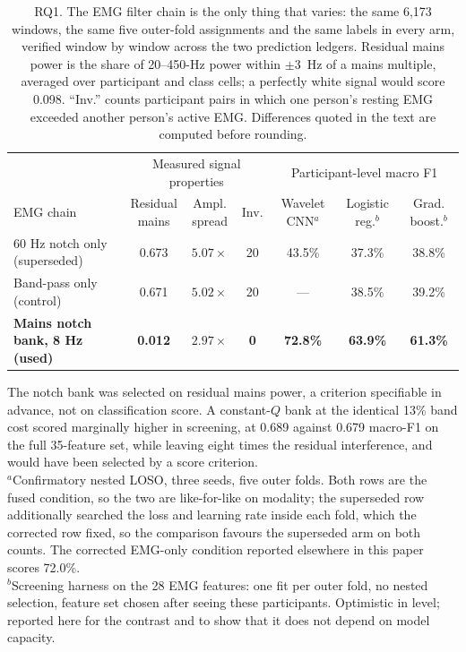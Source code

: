 \documentclass[pdflatex,sn-nature,iicol]{sn-jnl}
\begin{document}
\begin{table}[t]
  \centering
  \caption{RQ1. The EMG filter chain is the only thing that varies: the same 6,173 windows, the same five outer-fold assignments and the same labels in every arm, verified window by window across the two prediction ledgers. Residual mains power is the share of 20--450-Hz power within $\pm3$~Hz of a mains multiple, averaged over participant and class cells; a perfectly white signal would score 0.098. ``Inv.'' counts participant pairs in which one person's resting EMG exceeded another person's active EMG. Differences quoted in the text are computed before rounding.}
  \label{tab:filter}
  \footnotesize
  \begin{tabular*}{\textwidth}{@{\extracolsep{\fill}}lcccccc@{}}
    \toprule
    & \multicolumn{3}{c}{Measured signal properties} & \multicolumn{3}{c}{Participant-level macro F1} \\
    \cmidrule(lr){2-4}\cmidrule(lr){5-7}
    EMG chain & \shortstack{Residual\\mains} & \shortstack{Ampl.\\spread} & Inv. & \shortstack{Wavelet\\CNN$^{a}$} & \shortstack{Logistic\\reg.$^{b}$} & \shortstack{Grad.\\boost.$^{b}$} \\
    \midrule
    60 Hz notch only (superseded) & 0.673 & $5.07\times$ & 20 & 43.5\% & 37.3\% & 38.8\% \\
    Band-pass only (control) & 0.671 & $5.02\times$ & 20 & --- & 38.5\% & 39.2\% \\
    \midrule
    \textbf{Mains notch bank, 8 Hz (used)} & \textbf{0.012} & $\mathbf{2.97\times}$ & \textbf{0} & \textbf{72.8\%} & \textbf{63.9\%} & \textbf{61.3\%} \\
    \bottomrule
  \end{tabular*}
  \begin{flushleft}\footnotesize
  The notch bank was selected on residual mains power, a criterion specifiable in advance, not on classification score. A constant-$Q$ bank at the identical 13\% band cost scored marginally higher in screening, at 0.689 against 0.679 macro-F1 on the full 35-feature set, while leaving eight times the residual interference, and would have been selected by a score criterion.\\
  $^{a}$Confirmatory nested LOSO, three seeds, five outer folds. Both rows are the fused condition, so the two are like-for-like on modality; the superseded row additionally searched the loss and learning rate inside each fold, which the corrected row fixed, so the comparison favours the superseded arm on both counts. The corrected EMG-only condition reported elsewhere in this paper scores 72.0\%.\\
  $^{b}$Screening harness on the 28 EMG features: one fit per outer fold, no nested selection, feature set chosen after seeing these participants. Optimistic in level; reported here for the contrast and to show that it does not depend on model capacity.
  \end{flushleft}
\end{table}
\end{document}
